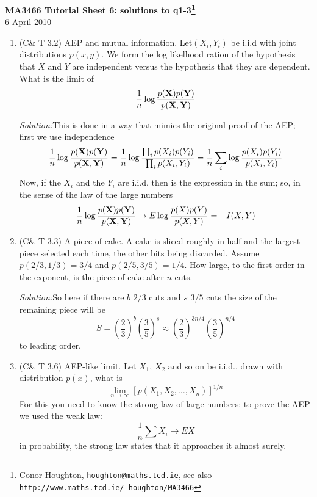 \documentclass[12pt]{article}
\newcommand{\soln}{\noindent\textit{Solution:}}
\begin{document}
\begin{center}
{\bf MA3466 Tutorial Sheet 6: solutions to q1-3\footnote{Conor Houghton, {\tt houghton@maths.tcd.ie}, see also {\tt http://www.maths.tcd.ie/ houghton/MA3466}}}\\[1cm]{} 6 April 2010
\end{center}
\begin{enumerate}

\item (C\& T 3.2) AEP and mutual information. Let$(X_i,Y_i)$ be i.i.d with joint distributions $p(x,y)$. We form the log likelhood ration of the hypothesis that $X$ and $Y$ are independent versus the hypothesis that they are dependent. What is the limit of 
\begin{equation}
\frac{1}{n}\log{\frac{p({\bf X})p({\bf Y})}{p({\bf X},{\bf Y})}}
\end{equation}

\soln This is done in a way that mimics the original proof of the AEP; first we use independence
\begin{equation}
\frac{1}{n}\log{\frac{p({\bf X})p({\bf Y})}{p({\bf X},{\bf Y})}}=\frac{1}{n}\log{\frac{\prod_ip(X_i)p(Y_i)}{\prod_ip(X_i,Y_i)}}=\frac{1}{n}\sum_i\log{\frac{p(X_i)p(Y_i)}{p(X_i,Y_i)}}
\end{equation}
Now, if the $X_i$ and the $Y_i$ are i.i.d. then is the expression in the sum; so, in the sense of the law of the large numbers 
\begin{equation}
\frac{1}{n}\log{\frac{p({\bf X})p({\bf Y})}{p({\bf X},{\bf Y})}}\rightarrow E\log{\frac{p(X)p(Y)}{p(X,Y)}}=-I(X,Y)
\end{equation}

\item (C\& T 3.3) A piece of cake. A cake is sliced roughly in half and the largest piece selected each time, the other bits being discarded. Assume $p(2/3,1/3)=3/4$ and $p(2/5,3/5)=1/4$. How large, to the first order in the exponent, is the piece of cake after $n$ cuts.

\soln So here if there are $b$ $2/3$ cuts and $s$ $3/5$ cuts the size of the remaining piece will be
\begin{equation}
S=\left(\frac{2}{3}\right)^b\left(\frac{3}{5}\right)^s\approx\left(\frac{2}{3}\right)^{3n/4}\left(\frac{3}{5}\right)^{n/4}
\end{equation}
to leading order.

\item (C\& T 3.6) AEP-like limit. Let $X_1$, $X_2$ and so on be i.i.d., drawn with distribution $p(x)$, what is
\begin{equation}
\lim_{n\rightarrow \infty}[p(X_1,X_2,\ldots,X_n)]^{1/n}
\end{equation}
For this you need to know the strong law of large numbers: to prove the AEP we used the weak law:
\begin{equation}
\frac{1}{n}\sum X_i \rightarrow EX
\end{equation}
in probability, the strong law states that it approaches it almost surely.


\end{enumerate}
\end{document}
